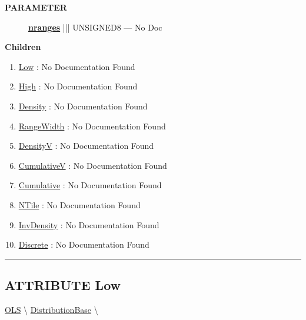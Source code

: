 \par
\begin{description}
\item [\colorbox{tagtype}{\color{white} \textbf{\textsf{PARAMETER}}}] \textbf{\underline{nranges}} ||| UNSIGNED8 --- No Doc
\end{description}






\textbf{Children}
\begin{enumerate}
\item \hyperlink{ecldoc:linearregression.ols.distributionbase.low}{Low}
: No Documentation Found
\item \hyperlink{ecldoc:linearregression.ols.distributionbase.high}{High}
: No Documentation Found
\item \hyperlink{ecldoc:linearregression.ols.distributionbase.density}{Density}
: No Documentation Found
\item \hyperlink{ecldoc:linearregression.ols.distributionbase.rangewidth}{RangeWidth}
: No Documentation Found
\item \hyperlink{ecldoc:linearregression.ols.distributionbase.densityv}{DensityV}
: No Documentation Found
\item \hyperlink{ecldoc:linearregression.ols.distributionbase.cumulativev}{CumulativeV}
: No Documentation Found
\item \hyperlink{ecldoc:linearregression.ols.distributionbase.cumulative}{Cumulative}
: No Documentation Found
\item \hyperlink{ecldoc:linearregression.ols.distributionbase.ntile}{NTile}
: No Documentation Found
\item \hyperlink{ecldoc:linearregression.ols.distributionbase.invdensity}{InvDensity}
: No Documentation Found
\item \hyperlink{ecldoc:linearregression.ols.distributionbase.discrete}{Discrete}
: No Documentation Found
\end{enumerate}

\rule{\linewidth}{0.5pt}

\subsection*{\textsf{\colorbox{headtoc}{\color{white} ATTRIBUTE}
Low}}

\hypertarget{ecldoc:linearregression.ols.distributionbase.low}{}
\hspace{0pt} \hyperlink{ecldoc:linearregression.ols}{OLS} \textbackslash 
\hspace{0pt} \hyperlink{ecldoc:linearregression.ols.distributionbase}{DistributionBase} \textbackslash 

